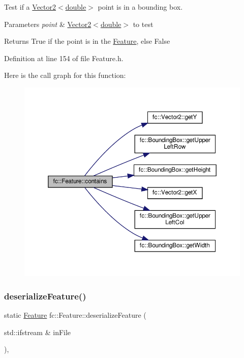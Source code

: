 Test if a \hyperlink{classfc_1_1Vector2}{Vector2$<$double$>$} point is in a bounding box. 


\begin{DoxyParams}{Parameters}
{\em point} & \hyperlink{classfc_1_1Vector2}{Vector2$<$double$>$} to test \\
\hline
\end{DoxyParams}
\begin{DoxyReturn}{Returns}
True if the point is in the \hyperlink{classfc_1_1Feature}{Feature}, else False 
\end{DoxyReturn}


Definition at line 154 of file Feature.\+h.

Here is the call graph for this function\+:
\nopagebreak
\begin{figure}[H]
\begin{center}
\leavevmode
\includegraphics[width=350pt]{d7/d71/classfc_1_1Feature_a0f716104b68b033b427c60c1f2672a76_cgraph}
\end{center}
\end{figure}
\mbox{\label{classfc_1_1Feature_a6ea5b6e3e6d14f29a6faa9b4464f8d4b}} 
\subsubsection{\texorpdfstring{deserialize\+Feature()}{deserializeFeature()}}
{\footnotesize\ttfamily static \hyperlink{classfc_1_1Feature}{Feature} fc\+::\+Feature\+::deserialize\+Feature (\begin{DoxyParamCaption}\item[{std\+::ifstream \&}]{in\+File }\end{DoxyParamCaption})\hspace{0.3cm}{\ttfamily [inline]}, {\ttfamily [static]}}



